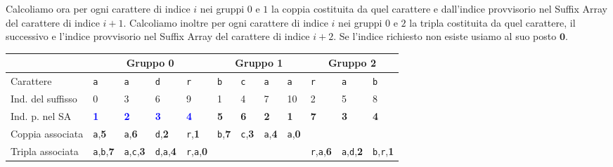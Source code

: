Calcoliamo ora per ogni carattere di indice \(i\) nei gruppi \(0\) e \(1\) la 
coppia costituita da quel carattere e dall'indice provvisorio nel Suffix Array
del carattere di indice \(i+1\). Calcoliamo inoltre per ogni carattere di indice 
\(i\) nei gruppi \(0\) e \(2\) la tripla costituita da quel carattere, il 
successivo e l'indice provvisorio nel Suffix Array del carattere di indice 
\(i+2\). Se l'indice richiesto non esiste usiamo al suo posto \(\textbf{0}\).
\begin{table}[H]
  \begin{tabularx}{\linewidth}{l*{11}{X}}
                        & \multicolumn{4}{c}{Gruppo 0 \cellcolor{green} } 
                        & \multicolumn{4}{c}{Gruppo 1 \cellcolor{red} } 
                        & \multicolumn{3}{c}{Gruppo 2 \cellcolor{yellow} }\\
    \hline
    Carattere           & \texttt{a} & \texttt{a} & \texttt{d} & \texttt{r}
                        & \texttt{b} & \texttt{c} & \texttt{a} & \texttt{a}
                        & \texttt{r} & \texttt{a} & \texttt{b} \\
    Ind. del suffisso   & 0 & 3 & 6 & 9
                        & 1 & 4 & 7 & 10
                        & 2 & 5 & 8 \\
    Ind. p. nel SA      & \textcolor{blue}{\textbf{1}} 
                        & \textcolor{blue}{\textbf{2}} 
                        & \textcolor{blue}{\textbf{3}}
                        & \textcolor{blue}{\textbf{4}}
                        & \textbf{5} & \textbf{6} & \textbf{2} & \textbf{1}
                        & \textbf{7} & \textbf{3} & \textbf{4} \\

    Coppia associata    & \texttt{a},\textbf{5} & \texttt{a},\textbf{6}
                        & \texttt{d},\textbf{2} & \texttt{r},\textbf{1}
                        & \texttt{b},\textbf{7} & \texttt{c},\textbf{3}
                        & \texttt{a},\textbf{4} & \texttt{a},\textbf{0}
                        & \multicolumn{3}{c}{\cellcolor{gray!25}} \\
    Tripla associata    & \texttt{a},\texttt{b},\textbf{7}
                        & \texttt{a},\texttt{c},\textbf{3}
                        & \texttt{d},\texttt{a},\textbf{4} 
                        & \texttt{r},\texttt{a},\textbf{0}
                        & \multicolumn{4}{c}{\cellcolor{gray!25}}
                        & \texttt{r},\texttt{a},\textbf{6}
                        & \texttt{a},\texttt{d},\textbf{2}
                        & \texttt{b},\texttt{r},\textbf{1} \\
  \end{tabularx}
\end{table}

